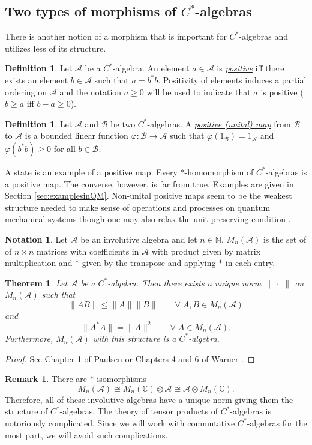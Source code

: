 \documentclass[12pt]{article}
\theoremstyle{theorem}
\newtheorem{theorem}[equation]{Theorem}
\theoremstyle{definition}
\newtheorem{definition}[equation]{Definition}
\newtheorem{remark}[equation]{Remark}
\newtheorem{notation}[equation]{Notation}
\numberwithin{equation}{section}
\let\C=\Chi \let\W=\Omega
\def\vf{\varphi}
\newcommand{\be}{\begin{equation}}
\newcommand{\ee}{\end{equation}}
\newcommand{\bt}{\begin{theorem}}
\newcommand{\et}{\end{theorem}}
\newcommand{\bd}{\begin{definition}}
\newcommand{\ed}{\end{definition}}
\newcommand{\bprf}{\begin{proof}}
\newcommand{\eprf}{\end{proof}}
\newcommand{\br}{\begin{remark}}
\newcommand{\er}{\end{remark}}
\newcommand{\<}{\langle}
\renewcommand{\>}{\rangle}
\def\C{{{\mathbb C}}}
\def\N{{{\mathbb N}}}
\def\mA{{{\mathcal{A}}}}
\def\mB{{{\mathcal{B}}}}
\begin{document}
\subsection{Two types of morphisms of $C^*$-algebras}

There is another notion of a morphism that is important
for $C^*$-algebras and utilizes less of its structure. 

\bd
Let $\mA$ be a $C^*$-algebra. An element $a\in\mA$ is 
\emph{\uline{positive}} iff there exists an element $b\in\mA$ such that
$a=b^*b.$ Positivity of elements induces a partial ordering on $\mA$
and the notation $a\ge0$ will be used to indicate that $a$ is positive
($b\ge a$ iff $b-a\ge0$).
\ed

\bd
Let $\mA$ and $\mB$ be two $C^*$-algebras. 
A \emph{\uline{positive (unital) map}} from $\mB$ to $\mA$ is a 
bounded linear function $\varphi:\mB\to\mA$ such that 
$\vf(1_{\mB})=1_{\mA}$ and $\vf(b^*b)\ge0$ for all $b\in\mB.$ 
\ed

A state is an example of a positive map. 
Every $*$-homomorphism of $C^*$-algebras is a positive map.
The converse, however, is far from true.
Examples are given in Section \ref{sec:examplesinQM}. 
Non-unital positive maps seem to be the weakest structure 
needed to make sense of operations and processes 
on quantum mechanical systems though one may also relax the
unit-preserving condition \cite{Kr83}.

\begin{notation}
Let $\mA$ be an involutive algebra and let $n\in\N.$ 
$M_{n}(\mA)$ is the set of of $n\times n$ matrices with
coefficients in $\mA$ with product given by matrix multiplication
and $*$ given by the transpose and applying $*$ in each entry. 
\end{notation}

\bt
Let $\mA$ be a $C^*$-algebra.
Then there exists a unique norm $\lVert\;\cdot\;\rVert$ on $M_{n}(\mA)$ 
such that 
\be
\lVert AB\rVert\le\lVert A\rVert \lVert B\rVert\qquad\forall\;A,B\in M_{n}(\mA)
\ee
and
\be
\lVert A^*A\rVert=\lVert A\rVert^2\qquad\forall\;A\in M_{n}(\mA).
\ee
Furthermore, $M_{n}(\mA)$ with this structure is a $C^*$-algebra.
\et

\bprf
See Chapter 1 of Paulsen \cite{Pa03} 
or Chapters 4 and 6 of Warner \cite{Wa10}.
\eprf

\br
There are $*$-isomorphisms
\be
M_{n}(\mA)\cong M_{n}(\C)\otimes\mA\cong \mA\otimes M_{n}(\C).
\ee
Therefore, all of these involutive algebras have a unique norm 
giving them the structure of $C^*$-algebras. 
The theory of tensor products of $C^*$-algebras is notoriously complicated.
Since we will work with commutative $C^*$-algebras for the most part, we
will avoid such complications. 
\er
\end{document}
